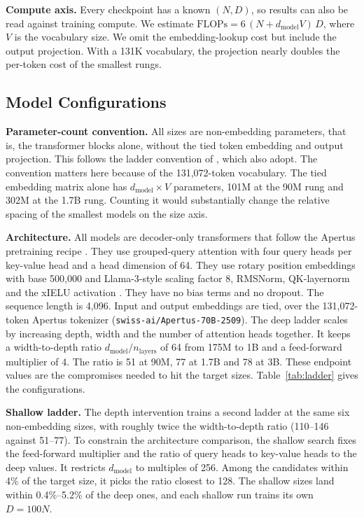 \textbf{Compute axis.} Every checkpoint has a known $(N, D)$, so results can also be read against training compute. We estimate $\mathrm{FLOPs} = 6\,(N + d_{\mathrm{model}} V)\,D$, where $V$ is the vocabulary size. We omit the embedding-lookup cost but include the output projection. With a 131K vocabulary, the projection nearly doubles the per-token cost of the smallest rungs.

\subsection{Model Configurations}
\label{app:model-configurations}

\textbf{Parameter-count convention.} All sizes are non-embedding parameters, that is, the transformer blocks alone, without the tied token embedding and output projection. This follows the ladder convention of \citet{bhagia_establishing_2025}, which \citet{heineman_signal_2025} also adopt. The convention matters here because of the 131,072-token vocabulary. The tied embedding matrix alone has $d_{\mathrm{model}} \times V$ parameters, 101M at the 90M rung and 302M at the 1.7B rung. Counting it would substantially change the relative spacing of the smallest models on the size axis.

\textbf{Architecture.} All models are decoder-only transformers that follow the Apertus pretraining recipe \citep{apertus_apertus_2025}. They use grouped-query attention \citep{ainslie_gqa_2023} with four query heads per key-value head and a head dimension of 64. They use rotary position embeddings \citep{su_roformer_2023} with base 500,000 and Llama-3-style scaling factor 8, RMSNorm, QK-layernorm and the xIELU activation \citep{huang_xielu_2025}. They have no bias terms and no dropout. The sequence length is 4,096. Input and output embeddings are tied, over the 131,072-token Apertus tokenizer (\texttt{swiss-ai/Apertus-70B-2509}). The deep ladder scales by increasing depth, width and the number of attention heads together. It keeps a width-to-depth ratio $d_{\mathrm{model}}/n_{\mathrm{layers}}$ of 64 from 175M to 1B and a feed-forward multiplier of 4. The ratio is 51 at 90M, 77 at 1.7B and 78 at 3B. These endpoint values are the compromises needed to hit the target sizes. Table~\ref{tab:ladder} gives the configurations.

\textbf{Shallow ladder.} The depth intervention trains a second ladder at the same six non-embedding sizes, with roughly twice the width-to-depth ratio (110--146 against 51--77). To constrain the architecture comparison, the shallow search fixes the feed-forward multiplier and the ratio of query heads to key-value heads to the deep values. It restricts $d_{\mathrm{model}}$ to multiples of 256. Among the candidates within 4\% of the target size, it picks the ratio closest to 128. The shallow sizes land within 0.4\%--5.2\% of the deep ones, and each shallow run trains its own $D = 100N$.

